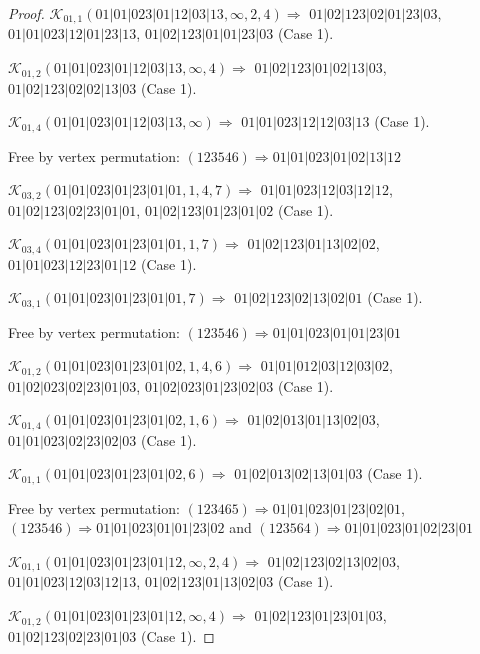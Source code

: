 \documentclass[12pt]{article}
\theoremstyle{plain}
\theoremstyle{definition}
\theoremstyle{remark}
\newcommand{\fancy}[1]{\mathcal{#1}}
\def\K{\fancy{K}}
\begin{document}
\begin{proof}
	\bigskip
	
	$\K_{01,1}(01|01|023|01|12|03|13,\infty,2, 4)\Rightarrow $ $01|02|123|02|01|23|03$, $01|01|023|12|01|23|13$, $01|02|123|01|01|23|03$ (Case 1).
	
	$\K_{01,2}(01|01|023|01|12|03|13,\infty,4)\Rightarrow $ $01|02|123|01|02|13|03$, $01|02|123|02|02|13|03$ (Case 1).
	
	$\K_{01,4}(01|01|023|01|12|03|13,\infty)\Rightarrow $ $01|01|023|12|12|03|13$ (Case 1).
	
	
	
	Free by vertex permutation: $(1 2 3 5 4 6)\Rightarrow 01|01|023|01|02|13|12$
	
	
	
	\bigskip
	
	$\K_{03,2}(01|01|023|01|23|01|01,1, 4, 7)\Rightarrow $ $01|01|023|12|03|12|12$, $01|02|123|02|23|01|01$, $01|02|123|01|23|01|02$ (Case 1).
	
	$\K_{03,4}(01|01|023|01|23|01|01,1, 7)\Rightarrow $ $01|02|123|01|13|02|02$, $01|01|023|12|23|01|12$ (Case 1).
	
	$\K_{03,1}(01|01|023|01|23|01|01,7)\Rightarrow $ $01|02|123|02|13|02|01$ (Case 1).
	
	
	
	Free by vertex permutation: $(1 2 3 5 4 6)\Rightarrow 01|01|023|01|01|23|01$
	
	
	
	\bigskip
	
	$\K_{01,2}(01|01|023|01|23|01|02,1, 4, 6)\Rightarrow $ $01|01|012|03|12|03|02$, $01|02|023|02|23|01|03$, $01|02|023|01|23|02|03$ (Case 1).
	
	$\K_{01,4}(01|01|023|01|23|01|02,1, 6)\Rightarrow $ $01|02|013|01|13|02|03$, $01|01|023|02|23|02|03$ (Case 1).
	
	$\K_{01,1}(01|01|023|01|23|01|02,6)\Rightarrow $ $01|02|013|02|13|01|03$ (Case 1).
	
	
	
	Free by vertex permutation: $(1 2 3 4 6 5)\Rightarrow 01|01|023|01|23|02|01$, $(1 2 3 5 4 6)\Rightarrow 01|01|023|01|01|23|02$ and $(1 2 3 5 6 4)\Rightarrow 01|01|023|01|02|23|01$
	
	
	
	\bigskip
	
	$\K_{01,1}(01|01|023|01|23|01|12,\infty,2, 4)\Rightarrow $ $01|02|123|02|13|02|03$, $01|01|023|12|03|12|13$, $01|02|123|01|13|02|03$ (Case 1).
	
	$\K_{01,2}(01|01|023|01|23|01|12,\infty,4)\Rightarrow $ $01|02|123|01|23|01|03$, $01|02|123|02|23|01|03$ (Case 1).
	

\end{proof}
\end{document}

